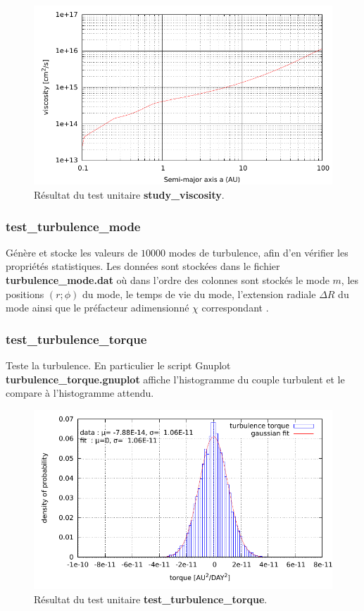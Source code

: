 \begin{figure}[htbp]
\centering
\includegraphics[width=0.65\linewidth]{figure/unitary_tests/viscosity.pdf}
\caption{Résultat du test unitaire \textbf{study\_viscosity}.}
\end{figure}

\subsubsection{test\_turbulence\_mode}
Génère et stocke les valeurs de $10000$ modes de turbulence, afin d'en vérifier les propriétés statistiques. Les données sont stockées dans le fichier \textbf{turbulence\_mode.dat} où dans l'ordre des colonnes sont stockés le mode $m$, les positions $(r;\phi)$ du mode, le temps de vie du mode, l'extension radiale $\Delta R$ du mode ainsi que le préfacteur adimensionné $\chi$ correspondant \citep[pour plus de détails]{ogihara2007accretion}. 

\subsubsection{test\_turbulence\_torque}
Teste la turbulence. En particulier le script Gnuplot \textbf{turbulence\_torque.gnuplot} affiche l'histogramme du couple turbulent et le compare à l'histogramme attendu. 

\begin{figure}[htbp]
\centering
\includegraphics[width=0.65\linewidth]{figure/unitary_tests/turbulence_torque.pdf}
\caption{Résultat du test unitaire \textbf{test\_turbulence\_torque}.}
\end{figure}

